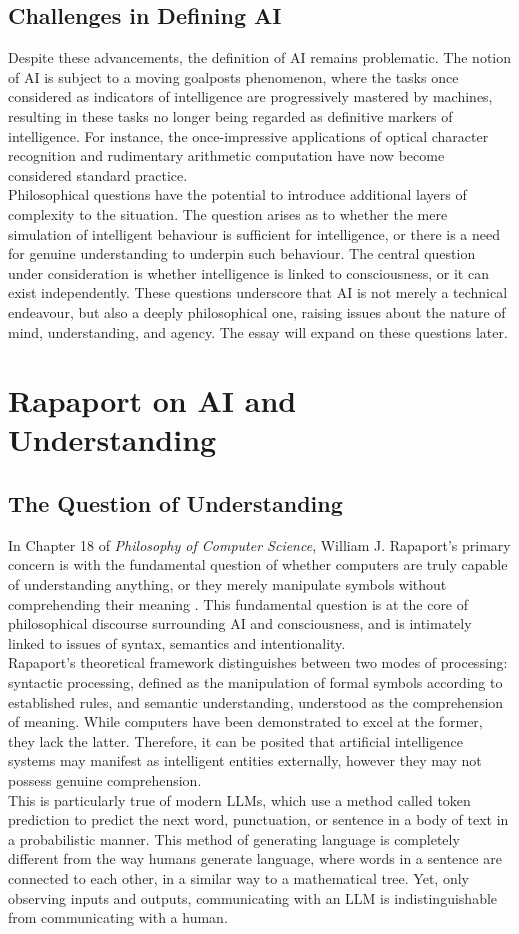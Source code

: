 \documentclass[runningheads]{llncs}
\begin{document}
\subsection{Challenges in Defining AI}
%
Despite these advancements, the definition of AI remains problematic. The notion of AI is subject to a moving goalposts phenomenon, where the tasks once considered as indicators of intelligence are progressively mastered by machines, resulting in these tasks no longer being regarded as definitive markers of intelligence. For instance, the once-impressive applications of optical character recognition and rudimentary arithmetic computation have now become considered standard practice.
\\
Philosophical questions have the potential to introduce additional layers of complexity to the situation. The question arises as to whether the mere simulation of intelligent behaviour is sufficient for intelligence, or there is a need for genuine understanding to underpin such behaviour. The central question under consideration is whether intelligence is linked to consciousness, or it can exist independently. These questions underscore that AI is not merely a technical endeavour, but also a deeply philosophical one, raising issues about the nature of mind, understanding, and agency. The essay will expand on these questions later.
%
%
%
%
%
\section{Rapaport on AI and Understanding}
\subsection{The Question of Understanding}
%
In Chapter 18 of \textit{Philosophy of Computer Science}, William J. Rapaport's primary concern is with the fundamental question of whether computers are truly capable of understanding anything, or they merely manipulate symbols without comprehending their meaning 
\cite{rapaport}. 
This fundamental question is at the core of philosophical discourse surrounding AI and consciousness, and is intimately linked to issues of syntax, semantics and intentionality.
\\
Rapaport's theoretical framework distinguishes between two modes of processing: syntactic processing, defined as the manipulation of formal symbols according to established rules, and semantic understanding, understood as the comprehension of meaning. While computers have been demonstrated to excel at the former, they lack the latter. Therefore, it can be posited that artificial intelligence systems may manifest as intelligent entities externally, however they may not possess genuine comprehension.
\\
This is particularly true of modern LLMs, which use a method called token prediction to predict the next word, punctuation, or sentence in a body of text in a probabilistic manner. This method of generating language is completely different from the way humans generate language, where words in a sentence are connected to each other, in a similar way to a mathematical tree. Yet, only observing inputs and outputs, communicating with an LLM is indistinguishable from communicating with a human.
%
%
\end{document}
